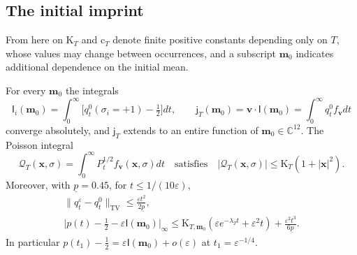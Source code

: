 \subsection{The initial imprint}\label{app:sel_imprint}

From here on $\mathrm K_T$ and $\mathrm c_T$ denote finite positive constants depending only on $T$, whose values may change between occurrences, and a subscript $\mathbf m_0$ indicates additional dependence on the initial mean.

\begin{lemma}[Imprint]\label{lem:sel_imprint}
For every $\mathbf m_0$ the integrals
\begin{equation}
\mathsf I_i(\mathbf m_0)=\int_0^\infty\bigl[q^0_t(\sigma_i=+1)-\tfrac12\bigr]dt,\qquad
\mathsf j_T(\mathbf m_0)=\mathbf v\cdot\mathsf I(\mathbf m_0)=\int_0^\infty q^0_tf_{\mathbf v}dt
\label{eq:sel_imprint}
\end{equation}
converge absolutely, and $\mathsf j_T$ extends to an entire function of $\mathbf m_0\in\mathbb C^{12}$. The Poisson integral
\begin{equation}
\mathcal Q_T(\mathbf x,\sigma)=\int_0^\infty P^{1/2}_tf_{\mathbf v}(\mathbf x,\sigma)dt
\quad\text{satisfies}\quad
|\mathcal Q_T(\mathbf x,\sigma)|\le\mathrm K_T(1+|\mathbf x|^2).
\label{eq:sel_poisson}
\end{equation}
Moreover, with $\underline p=0.45$, for $t\le1/(10\varepsilon)$,
\begin{equation}
\begin{gathered}
\|q^\varepsilon_t-q^0_t\|_{\mathrm{TV}}\le\frac{\varepsilon t^2}{2\underline p},\\
\bigl|p(t)-\tfrac12-\varepsilon\mathsf I(\mathbf m_0)\bigr|_\infty\le\mathrm K_{T,\mathbf m_0}(\varepsilon e^{-\lambda_Tt}+\varepsilon^2t)+\frac{\varepsilon^2t^3}{6\underline p}.
\end{gathered}
\label{eq:sel_imprint_expansion}
\end{equation}
In particular $p(t_1)-\frac12=\varepsilon\mathsf I(\mathbf m_0)+o(\varepsilon)$ at $t_1=\varepsilon^{-1/4}$.
\end{lemma}

